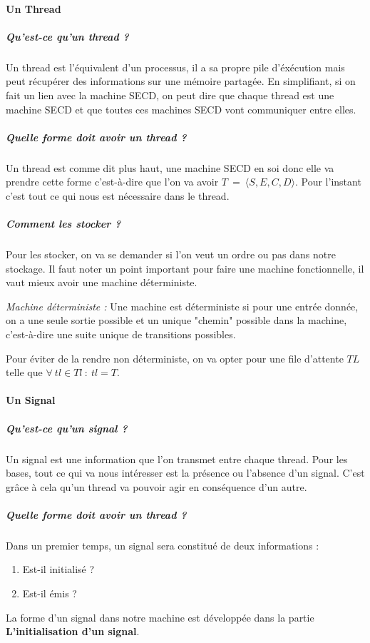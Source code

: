\documentclass[10pt,a4paper]{report}
\begin{document}
	\paragraph{Un Thread}
	
	\subparagraph{Qu'est-ce qu'un thread ?}
	Un thread est l'équivalent d'un processus, il a sa propre pile d'éxécution mais peut récupérer des informations sur une mémoire partagée. En simplifiant, si on fait un lien avec la machine SECD, on peut dire que chaque thread est une machine SECD et que toutes ces machines SECD vont communiquer entre elles.
	
	\subparagraph{Quelle forme doit avoir un thread ?} 
	Un thread est comme dit plus haut, une machine SECD en soi donc elle va prendre cette forme c'est-à-dire que l'on va avoir $T~=~\langle S,E,C,D\rangle$. Pour l'instant c'est tout ce qui nous est nécessaire dans le thread.
	
	\subparagraph{Comment les stocker ?}
	Pour les stocker, on va se demander si l'on veut un ordre ou pas dans notre stockage. Il faut noter un point important pour faire une machine fonctionnelle, il vaut mieux avoir une machine déterministe.
	\medbreak
	
	\textit{Machine déterministe :} Une machine est déterministe si pour une entrée donnée, on a une seule sortie possible et un unique "chemin" possible dans la machine, c'est-à-dire une suite unique de transitions possibles.
	\medbreak
	
	Pour éviter de la rendre non déterministe, on va opter pour une file d'attente $TL$ telle que $\forall~tl \in Tl~:~tl = T$.
	\bigbreak
	
	\paragraph{Un Signal} 
	
	\subparagraph{Qu'est-ce qu'un signal ?}
	Un signal est une information que l'on transmet entre chaque thread. Pour les bases, tout ce qui va nous intéresser est la présence ou l'absence d'un signal. C'est grâce à cela qu'un thread va pouvoir agir en conséquence d'un autre. 
	
	\subparagraph{Quelle forme doit avoir un thread ?} 
	Dans un premier temps, un signal sera constitué de deux informations : 
	\begin{enumerate}
		\item Est-il initialisé ?
		\item Est-il émis ?
	\end{enumerate}
	La forme d'un signal dans notre machine est développée dans la partie \textbf{L'initialisation d'un signal}.
	
\end{document}
